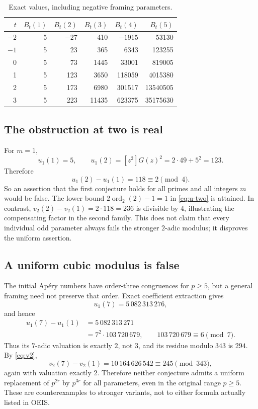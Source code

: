 \documentclass[11pt,letterpaper]{article}
\numberwithin{equation}{section}
\theoremstyle{definition}
\theoremstyle{remark}
\newcommand{\vtwo}{\operatorname{ord}_2}
\begin{document}
\begin{table}[htbp]
\centering
\small
\setlength{\tabcolsep}{9pt}
\begin{tabular}{rrrrrr}
\toprule
$t$ & $B_t(1)$ & $B_t(2)$ & $B_t(3)$ & $B_t(4)$ & $B_t(5)$\\
\midrule
$-2$ & 5 & $-27$ & 410 & $-1915$ & 53130\\
$-1$ & 5 & 23 & 365 & 6343 & 123255\\
0 & 5 & 73 & 1445 & 33001 & 819005\\
1 & 5 & 123 & 3650 & 118059 & 4015380\\
2 & 5 & 173 & 6980 & 301517 & 13540505\\
3 & 5 & 223 & 11435 & 623375 & 35175630\\
\bottomrule
\end{tabular}
\caption{Exact values, including negative framing parameters.}\label{tab:values}
\end{table}

\subsection{The obstruction at two is real}
For $m=1$,
\[
 u_1(1)=5,\qquad u_1(2)=[z^2]G(z)^2=2\cdot49+5^2=123.
\]
Therefore
\begin{equation}\label{eq:2counter}
 u_1(2)-u_1(1)=118\equiv2\pmod4.
\end{equation}
So an assertion that the first conjecture holds for all primes and all
integers $m$ would be false. The lower bound
$2\vtwo(2)-1=1$ in \eqref{eq:u-two} is attained.
In contrast, $v_2(2)-v_2(1)=2\cdot118=236$ is divisible by $4$, illustrating
the compensating factor in the second family. This does not claim that
every individual odd parameter always fails the stronger $2$-adic modulus;
it disproves the uniform assertion.

\subsection{A uniform cubic modulus is false}
The initial Ap\'ery numbers have order-three congruences for $p\ge5$,
but a general framing need not preserve that order.
Exact coefficient extraction gives
\[
 u_1(7)=5\,082\,313\,276,
\]
and hence
\begin{align*}
 u_1(7)-u_1(1)
 &=5\,082\,313\,271\\
 &=7^2\cdot103\,720\,679,
 \qquad 103\,720\,679\equiv6\pmod7.
\end{align*}
Thus its $7$-adic valuation is exactly $2$, not $3$, and its residue
modulo $343$ is $294$. By \eqref{eq:v2},
\[
 v_2(7)-v_2(1)=10\,164\,626\,542\equiv245\pmod{343},
\]
again with valuation exactly $2$. Therefore neither conjecture admits a
uniform replacement of $p^{2r}$ by $p^{3r}$ for all parameters, even in the
original range $p\ge5$. These are counterexamples to stronger variants,
not to either formula actually listed in OEIS.
\end{document}
